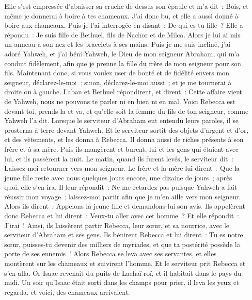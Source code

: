 \begin{multicols}{2}
Elle s'est empressée d'abaisser sa cruche de dessus son épaule et m'a dit~: Bois, et même je donnerai à boire à tes chameaux. J'ai donc bu, et elle a aussi donné à boire aux chameaux.
Puis je l'ai interrogée en disant~: De qui es-tu fille~? Elle a répondu~: Je suis fille de Bethuel, fils de Nachor et de Milca. Alors je lui ai mis un anneau à son nez et les bracelets à ses mains.
Puis je me suis incliné, j'ai adoré Yahweh, et j'ai béni Yahweh, le Dieu de mon seigneur Abraham, qui m'a conduit fidèlement, afin que je prenne la fille du frère de mon seigneur pour son fils.
Maintenant donc, si vous voulez user de bonté et de fidélité envers mon seigneur, déclarez-le-moi~; sinon, déclarez-le-moi aussi~; et je me tournerai à droite ou à gauche.
Laban et Bethuel répondirent, et dirent~: Cette affaire vient de Yahweh, nous ne pouvons te parler ni en bien ni en mal.
Voici Rebecca est devant toi, prends-la et va, et qu'elle soit la femme du fils de ton seigneur, comme Yahweh l'a dit.
Lorsque le serviteur d'Abraham eut entendu leurs paroles, il se prosterna à terre devant Yahweh.
Et le serviteur sortit des objets d'argent et d'or, et des vêtements, et les donna à Rebecca. Il donna aussi de riches présents à son frère et à sa mère.
Puis ils mangèrent et burent, lui et les gens qui étaient avec lui, et ils passèrent la nuit. Le matin, quand ils furent levés, le serviteur dit~: Laissez-moi retourner vers mon seigneur.
Le frère et la mère lui dirent~: Que la jeune fille reste avec nous quelques jours encore, une dizaine de jours~; après quoi, elle s'en ira.
Il leur répondit~: Ne me retardez pas puisque Yahweh a fait réussir mon voyage~; laissez-moi partir afin que je m'en aille vers mon seigneur.
Alors ils dirent~: Appelons la jeune fille et demandons-lui son avis.
Ils appelèrent donc Rebecca et lui dirent~: Veux-tu aller avec cet homme~? Et elle répondit~: J'irai~!
Ainsi, ils laissèrent partir Rebecca, leur sœur, et sa nourrice, avec le serviteur d'Abraham et ses gens.
Ils bénirent Rebecca et lui dirent~: Tu es notre sœur, puisses-tu devenir des milliers de myriades, et que ta postérité possède la porte de ses ennemis~!
Alors Rebecca se leva avec ses servantes, et elles montèrent sur les chameaux et suivirent l'homme. Et le serviteur prit Rebecca et s'en alla.
Or Isaac revenait du puits de Lachaï-roï, et il habitait dans le pays du midi.
Un soir qu'Isaac était sorti dans les champs pour prier, il leva les yeux et regarda, et voici, des chameaux arrivaient.

\end{multicols}
